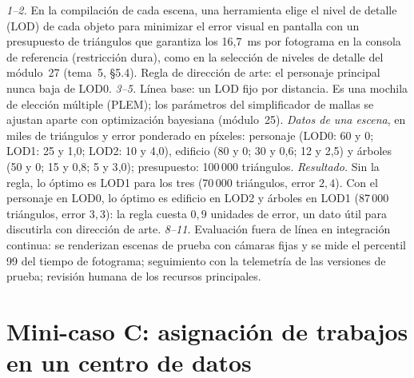 \begin{ejemplo}\label{ej:mini-3d}
\emph{1--2.} En la compilación de cada escena, una herramienta elige el nivel de detalle (LOD) de cada objeto para minimizar el error visual en pantalla con un presupuesto de triángulos que garantiza los 16{,}7~ms por fotograma en la consola de referencia (restricción dura), como en la selección de niveles de detalle del módulo~27 (tema~5, §5.4). Regla de dirección de arte: el personaje principal nunca baja de LOD0. \emph{3--5.} Línea base: un LOD fijo por distancia. Es una mochila de elección múltiple (PLEM); los parámetros del simplificador de mallas se ajustan aparte con optimización bayesiana (módulo~25). \emph{Datos de una escena}, en miles de triángulos y error ponderado en píxeles: personaje (LOD0: 60 y 0; LOD1: 25 y 1{,}0; LOD2: 10 y 4{,}0), edificio (80 y 0; 30 y 0{,}6; 12 y 2{,}5) y árboles (50 y 0; 15 y 0{,}8; 5 y 3{,}0); presupuesto: 100\,000 triángulos. \emph{Resultado.} Sin la regla, lo óptimo es LOD1 para los tres (70\,000 triángulos, error $2{,}4$). Con el personaje en LOD0, lo óptimo es edificio en LOD2 y árboles en LOD1 (87\,000 triángulos, error $3{,}3$): la regla cuesta $0{,}9$ unidades de error, un dato útil para discutirla con dirección de arte. \emph{8--11.} Evaluación fuera de línea en integración continua: se renderizan escenas de prueba con cámaras fijas y se mide el percentil 99 del tiempo de fotograma; seguimiento con la telemetría de las versiones de prueba; revisión humana de los recursos principales.
\end{ejemplo}

\section{Mini-caso C: asignación de trabajos en un centro de datos}

